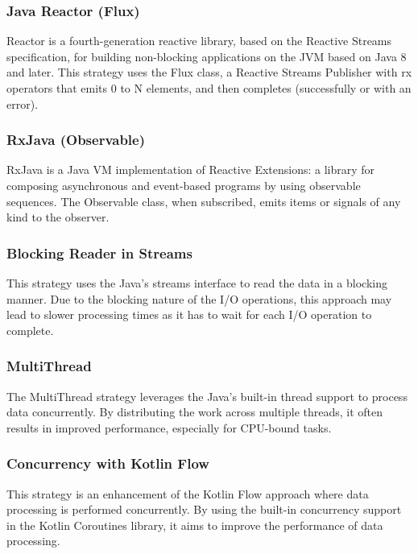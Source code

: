 \subsubsection{Java Reactor (Flux)}
\label{subsubsec:java_reactor_flux}
Reactor is a fourth-generation reactive library, based on the Reactive Streams specification, for building non-blocking applications on the JVM based on Java 8 and later. This strategy uses the Flux class, a Reactive Streams Publisher with rx operators that emits 0 to N elements, and then completes (successfully or with an error).

\subsubsection{RxJava (Observable)}
\label{subsubsec:rxjava_observable}
RxJava is a Java VM implementation of Reactive Extensions: a library for composing asynchronous and event-based programs by using observable sequences. The Observable class, when subscribed, emits items or signals of any kind to the observer. 

\subsubsection{Blocking Reader in Streams}
\label{subsubsec:blocking_reader_streams}
This strategy uses the Java's streams interface to read the data in a blocking manner. Due to the blocking nature of the I/O operations, this approach may lead to slower processing times as it has to wait for each I/O operation to complete.

\subsubsection{MultiThread}
\label{subsubsec:multithread}
The MultiThread strategy leverages the Java's built-in thread support to process data concurrently. By distributing the work across multiple threads, it often results in improved performance, especially for CPU-bound tasks.

\subsubsection{Concurrency with Kotlin Flow}
\label{subsubsec:concurrency_kotlin_flow}
This strategy is an enhancement of the Kotlin Flow approach where data processing is performed concurrently. By using the built-in concurrency support in the Kotlin Coroutines library, it aims to improve the performance of data processing.

